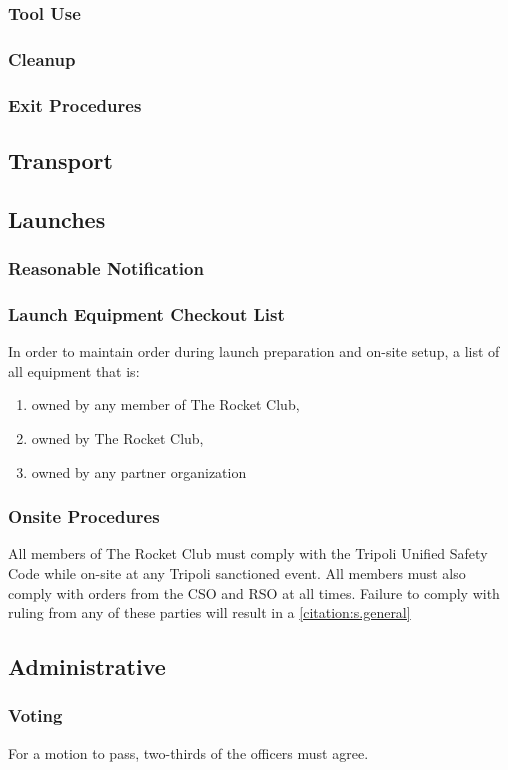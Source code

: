 \documentclass[12pt]{article}
\begin{document}
\subsubsection{Tool Use}
\subsubsection{Cleanup}
\subsubsection{Exit Procedures}
\subsection{Transport}
\subsection{Launches}
\subsubsection{Reasonable Notification}
\subsubsection{Launch Equipment Checkout List}
In order to maintain order during launch preparation and on-site setup,
a list of all equipment that is:
\begin{enumerate}
    \item owned by any member of The Rocket Club,
    \item owned by The Rocket Club,
    \item owned by any partner organization
\end{enumerate}
\subsubsection{Onsite Procedures}
All members of The Rocket Club must comply with the Tripoli Unified Safety Code while on-site at any Tripoli sanctioned event.
All members must also comply with orders from the CSO and RSO at all times.
Failure to comply with ruling from any of these parties will result in a \cref{citation:s.general}
\subsection{Administrative}
\subsubsection{Voting}
For a motion to pass, two-thirds of the officers must agree.
\end{document}
